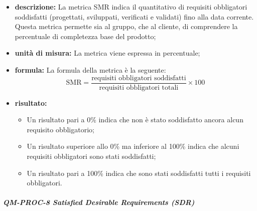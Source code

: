 			\begin{itemize}
			 
				\item \textbf{descrizione: }
				La metrica SMR indica il quantitativo di requisiti obbligatori soddisfatti (progettati, sviluppati, verificati e validati) fino alla data corrente. Questa metrica permette sia al gruppo, che al cliente, di comprendere la percentuale di completezza base del prodotto;

				\item \textbf{unità di misura: }
				La metrica viene espressa in percentuale;

				\item \textbf{formula: }
				La formula della metrica è la seguente:
				\[
					\text{SMR} = \frac{\text{requisiti obbligatori soddisfatti}}{\text{requisiti obbligatori totali}} \times 100
				\]

				\item \textbf{risultato: }
				\begin{itemize}
					\item Un risultato pari a 0\% indica che non è stato soddisfatto ancora alcun requisito obbligatorio;
					\item Un risultato superiore allo 0\% ma inferiore al 100\% indica che alcuni requisiti obbligatori sono stati soddisfatti;
					\item Un risultato pari a 100\% indica che sono stati soddisfatti tutti i requisiti obbligatori.
				\end{itemize}

			\end{itemize}

			\subparagraph{QM-PROC-8 Satisfied Desirable Requirements (SDR)}


